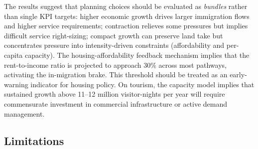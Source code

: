 \documentclass[urbansci,article,submit,pdftex,moreauthors]{Definitions/mdpi}
\begin{document}
The results suggest that planning choices should be evaluated as \emph{bundles}
rather than single KPI targets: higher economic growth drives larger immigration
flows and higher service requirements; contraction relieves some pressures but
implies difficult service right-sizing; compact growth can preserve land take
but concentrates pressure into intensity-driven constraints (affordability and
per-capita capacity). The housing-affordability feedback mechanism implies that
the rent-to-income ratio is projected to approach 30\% across most pathways,
activating the in-migration brake. This threshold should be treated as an
early-warning indicator for housing policy. On tourism, the capacity model
implies that sustained growth above 11--12 million visitor-nights per year will
require commensurate investment in commercial infrastructure or active demand
management.

\subsection{Limitations}
\end{document}
